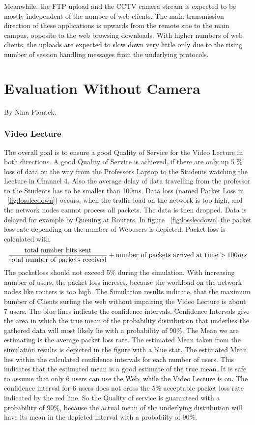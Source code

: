 \documentclass[a4paper,10pt]{book}\usepackage{graphicx}
\begin{document}
Meanwhile, the FTP upload and the CCTV camera stream is expected to be mostly independent of the number of web clients. The main transmission direction of these applications is upwards from the remote site to the main campus, opposite to the web browsing downloads. With higher numbers of web clients, the uploads are expected to slow down very little only due to the rising number of session handling messages from the underlying protocols.

\chapter{Evaluation Without Camera}
By Nina Piontek.\\

\subsection{Video Lecture}
The overall goal is to ensure a good Quality of Service for the Video Lecture in both directions.
A good Quality of Service is achieved, if there are only up 5 $\%$ loss of data
on the way from the Professors Laptop to the Students watching the Lecture in Channel 4. Also the average delay of data travelling from the professor to the Students has to be smaller than 100ms.
Data loss (named Packet Loss in ~\ref{fig:losslecdown}) occurs, when the traffic load on the network is too high, and the network nodes cannot process all packets.
The data is then dropped. Data is delayed for example by Queuing at Routers.
In figure  ~\ref{fig:losslecdown} the packet loss rate depending on the number of
Webusers is depicted. Packet loss is calculated with
\begin{equation}
 \frac{\textnormal{total number bits sent}}{\textnormal{total number of packets received}} + \textnormal{number of packets arrived at time} > 100ms
\end{equation}
The packetloss should not exceed 5$\%$ during the simulation.
With increasing number of users, the packet loss increses, because the 
workload on the network nodes like routers is too high.
The Simulation results indicate, that the maximum bumber of Clients surfing the 
web without impairing the Video Lecture is about 7 users.
The blue lines indicate the confidence intervals. Confidence Intervals give the area in which 
the true mean of the probability distribution that underlies the gathered data will most likely lie with a probability of 90$\%$.
The Mean we are estimating is the average packet loss rate. The estimated Mean taken from the simulation results is depicted in the figure with a blue star.
The estimated Mean lies within the calculated confidence intervals for each number of users. This indicates that the estimated mean is a good estimate of the true mean.
It is safe to assume that only 6 users can use the Web, while the Video Lecture is on.
The confidence interval for 6 users does not cross the 5$\%$ acceptable packet loss 
rate indicated by the red line. So the Quality of service is guaranteed with a probability of 90$\%$, because the actual mean of the
underlying distribution will have its mean in the depicted interval with a probabiity of 90$\%$.
\end{document}
